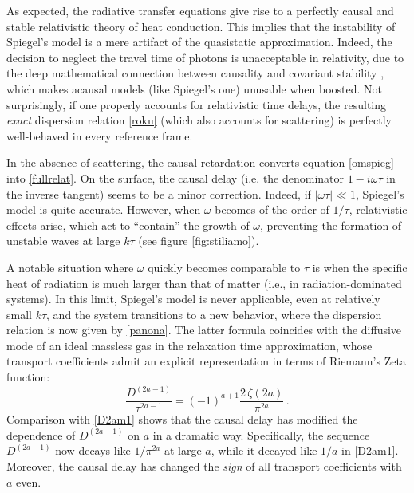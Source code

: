 \documentclass[a4paper, amsfonts, amssymb, amsmath, reprint, showkeys, nofootinbib, twoside,notitlepage,onecolumn]{revtex4-2}
\theoremstyle{definition}
\theoremstyle{theorem}
\theoremstyle{corollary}
\begin{document}
As expected, the radiative transfer equations give rise to a perfectly causal and stable relativistic theory of heat conduction. This implies that the instability of Spiegel's model is a mere artifact of the quasistatic approximation. Indeed, the decision to neglect the travel time of photons is unacceptable in relativity, due to the deep mathematical connection between causality and covariant stability \cite{GavassinoSuperluminal2021,GavassinoBounds2023}, which makes acausal models (like Spiegel's one) unusable when boosted. Not surprisingly, if one properly accounts for relativistic time delays, the resulting \textit{exact} dispersion relation \eqref{roku} (which also accounts for scattering) is perfectly well-behaved in every reference frame. 

In the absence of scattering, the causal retardation converts equation \eqref{omspieg} into \eqref{fullrelat}. On the surface, the causal delay (i.e. the denominator $1-i\omega\tau$ in the inverse tangent) seems to be a minor correction. Indeed, if $|\omega\tau|\ll 1$, Spiegel's model is quite accurate. However, when $\omega$ becomes of the order of $1/\tau$, relativistic effects arise, which act to ``contain'' the growth of $\omega$, preventing the formation of unstable waves at large $k\tau$ (see figure \ref{fig:stiliamo}). 

A notable situation where $\omega$ quickly becomes comparable to $\tau$ is when the specific heat of radiation is much larger than that of matter (i.e., in radiation-dominated systems). In this limit, Spiegel's model is never applicable, even at relatively small $k\tau$, and the system transitions to a new behavior, where the dispersion relation is now given by \eqref{panona}. The latter formula coincides with the diffusive mode of an ideal massless gas in the relaxation time approximation, whose transport coefficients admit an explicit representation in terms of Riemann's Zeta function:
\begin{equation}
\dfrac{D^{(2a-1)}}{\tau^{2a-1}} =(-1)^{a+1} \dfrac{2\, \zeta(2a)}{\pi^{2a}} \, .
\end{equation}
Comparison with \eqref{D2am1} shows that the causal delay has modified the dependence of $D^{(2a-1)}$ on $a$ in a dramatic way. Specifically, the sequence $D^{(2a-1)}$ now decays like $1/\pi^{2a}$ at large $a$, while it decayed like $1/a$ in \eqref{D2am1}. Moreover, the causal delay has changed the \textit{sign} of all transport coefficients with $a$ even. 

\end{document}
